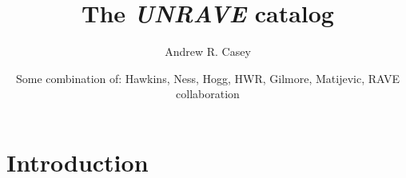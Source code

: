 \documentclass[preprint2,trackchanges]{aastex}
\newcommand{\project}[1]{\textsl{#1}}
\begin{document}
\title{The \project{UNRAVE} catalog}

\author{Andrew R. Casey}

\author{Some combination of: Hawkins, Ness, Hogg, HWR, Gilmore, Matijevic, RAVE collaboration}

\begin{abstract}
\end{abstract}

\keywords{}

\section{Introduction} \label{sec:intro}



\acknowledgements


\begin{thebibliography}{dummy}
\end{thebibliography}

\clearpage

\end{document}
